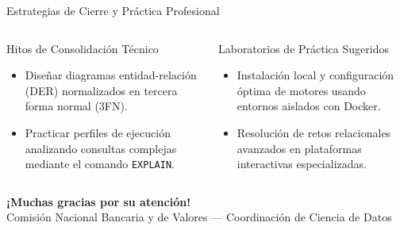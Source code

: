 \documentclass[12pt, aspectratio=169, UTF8]{beamer}
\begin{document}
\begin{frame}{Estrategias de Cierre y Práctica Profesional}
  \begin{columns}[T]
      \begin{block}{Hitos de Consolidación Técnico}
        \begin{itemize}
          \item Diseñar diagramas entidad-relación (DER) normalizados en tercera forma normal (3FN).
          \item Practicar perfiles de ejecución analizando consultas complejas mediante el comando \texttt{EXPLAIN}.
        \end{itemize}
      \end{block}
      \begin{exampleblock}{Laboratorios de Práctica Sugeridos}
        \begin{itemize}
          \item Instalación local y configuración óptima de motores usando entornos aislados con Docker.
          \item Resolución de retos relacionales avanzados en plataformas interactivas especializadas.
        \end{itemize}
      \end{exampleblock}
  \end{columns}
  \vspace{10pt}
  \centering
  \textbf{\Large ¡Muchas gracias por su atención!} \\
  \vspace{5pt}
  \footnotesize Comisión Nacional Bancaria y de Valores — Coordinación de Ciencia de Datos
\end{frame}
\end{document}
